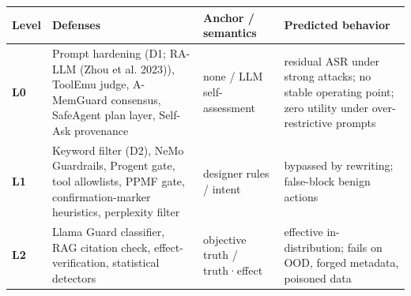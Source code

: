 \documentclass[11pt]{article}
\begin{document}
{\def\LTcaptype{none} %

\begin{table}[t]
\centering
\small
\begin{tabular}{@{}
>{\raggedright\arraybackslash}p{}

  >{\raggedright\arraybackslash}p{}

  >{\raggedright\arraybackslash}p{}

  >{\raggedright\arraybackslash}p{}@{}}

\hline

\begin{minipage}[b]{\linewidth}\raggedright

Level

\end{minipage} & \begin{minipage}[b]{\linewidth}\raggedright

Defenses

\end{minipage} & \begin{minipage}[b]{\linewidth}\raggedright

Anchor / semantics

\end{minipage} & \begin{minipage}[b]{\linewidth}\raggedright

Predicted behavior

\end{minipage} \\

\hline
\hline



\textbf{L0} & Prompt hardening (D1; RA-LLM ({Zhou et al.} 2023)), ToolEmu judge, A-MemGuard consensus, SafeAgent plan layer, Self-Ask provenance & none / LLM self-assessment & residual ASR under strong attacks; no stable operating point; zero utility under over-restrictive prompts \\

\textbf{L1} & Keyword filter (D2), NeMo Guardrails, Progent gate, tool allowlists, PPMF gate, confirmation-marker heuristics, perplexity filter & designer rules / intent & bypassed by rewriting; false-block benign actions \\

\textbf{L2} & Llama Guard classifier, RAG citation check, effect-verification, statistical detectors & objective truth / truth·effect & effective in-distribution; fails on OOD, forged metadata, poisoned data \\


\end{tabular}
\end{table}}
\end{document}
